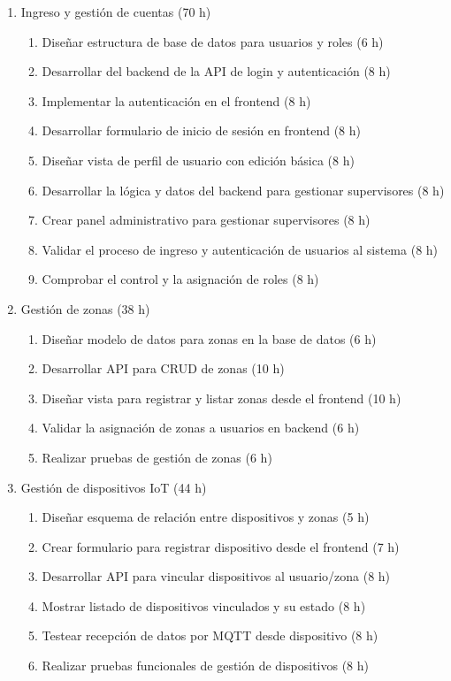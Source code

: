 \documentclass[
11pt, %
]{charter}
\begin{document}
\begin{enumerate}
    \item Ingreso y gestión de cuentas (70 h)
    \begin{enumerate}
        \item Diseñar estructura de base de datos para usuarios y roles (6 h)
        \item Desarrollar del backend de la API de login y autenticación (8 h)
        \item Implementar la autenticación en el frontend (8 h)
        \item Desarrollar formulario de inicio de sesión en frontend (8 h)
        \item Diseñar vista de perfil de usuario con edición básica (8 h)
        \item Desarrollar la lógica y datos del backend para gestionar supervisores (8 h)
        \item Crear panel administrativo para gestionar supervisores (8 h)
        \item Validar el proceso de ingreso y autenticación de usuarios al sistema (8 h)
        \item Comprobar el control y la asignación de roles (8 h)
    \end{enumerate}

    \item Gestión de zonas (38 h)
    \begin{enumerate}
        \item Diseñar modelo de datos para zonas en la base de datos (6 h)
        \item Desarrollar API para CRUD de zonas (10 h)
        \item Diseñar vista para registrar y listar zonas desde el frontend (10 h)
        \item Validar la asignación de zonas a usuarios en backend (6 h)
        \item Realizar pruebas de gestión de zonas (6 h)
    \end{enumerate}

    \item Gestión de dispositivos IoT (44 h)
    \begin{enumerate}
        \item Diseñar esquema de relación entre dispositivos y zonas (5 h)
        \item Crear formulario para registrar dispositivo desde el frontend (7 h)
        \item Desarrollar API para vincular dispositivos al usuario/zona (8 h)
        \item Mostrar listado de dispositivos vinculados y su estado (8 h)
        \item Testear recepción de datos por MQTT desde dispositivo (8 h)
        \item Realizar pruebas funcionales de gestión de dispositivos (8 h)
    \end{enumerate}


\end{enumerate}
\end{document}
